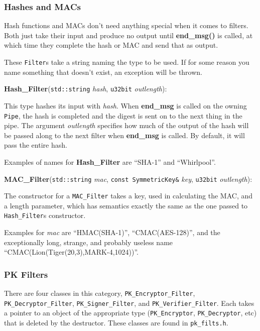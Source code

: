 \documentclass{article}
\newcommand{\filename}[1]{\texttt{#1}}
\newcommand{\function}[1]{\textbf{#1}}
\newcommand{\type}[1]{\texttt{#1}}
\renewcommand{\arg}[1]{\textsl{#1}}
\begin{document}
\subsubsection{Hashes and MACs}

Hash functions and MACs don't need anything special when it comes to
filters. Both just take their input and produce no output until
\function{end\_msg()} is called, at which time they complete the hash or MAC
and send that as output.

These \type{Filter}s take a string naming the type to be used. If for some
reason you name something that doesn't exist, an exception will be thrown.

\noindent
\function{Hash\_Filter}(\type{std::string} \arg{hash},
                        \type{u32bit} \arg{outlength}):

This type hashes its input with \arg{hash}. When \function{end\_msg} is called
on the owning \type{Pipe}, the hash is completed and the digest is sent on to
the next thing in the pipe. The argument \arg{outlength} specifies how much of
the output of the hash will be passed along to the next filter when
\function{end\_msg} is called. By default, it will pass the entire hash.

Examples of names for \function{Hash\_Filter} are ``SHA-1'' and ``Whirlpool''.

\noindent
\function{MAC\_Filter}(\type{std::string} \arg{mac},
                       \type{const SymmetricKey\&} \arg{key},
                       \type{u32bit} \arg{outlength}):

The constructor for a \type{MAC\_Filter} takes a key, used in calculating the
MAC, and a length parameter, which has semantics exactly the same as the one
passed to \type{Hash\_Filter}s constructor.

Examples for \arg{mac} are ``HMAC(SHA-1)'', ``CMAC(AES-128)'', and the
exceptionally long, strange, and probably useless name
``CMAC(Lion(Tiger(20,3),MARK-4,1024))''.

\subsubsection{PK Filters}

There are four classes in this category, \type{PK\_Encryptor\_Filter},
\type{PK\_Decryptor\_Filter}, \type{PK\_Signer\_Filter}, and
\type{PK\_Verifier\_Filter}. Each takes a pointer to an object of the
appropriate type (\type{PK\_Encryptor}, \type{PK\_Decryptor}, etc) that is
deleted by the destructor. These classes are found in \filename{pk\_filts.h}.
\end{document}
